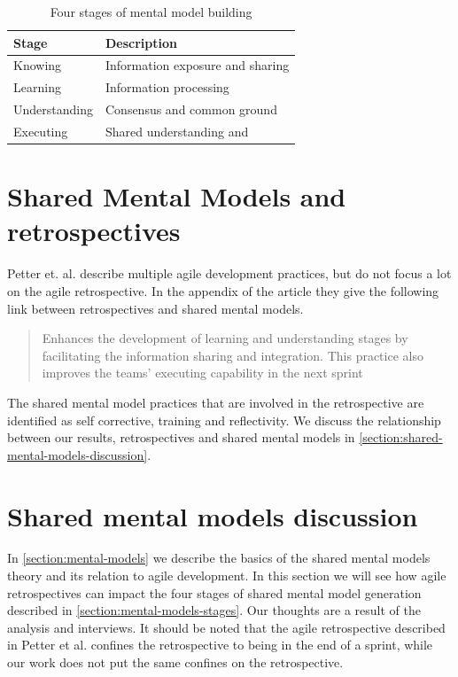 \begin{table}[!h]
	\begin{centering}
	\caption{Four stages of mental model building}
	\label{table:stages-mental-model}
	\begin{tabular}{l | p{}}

	\hline
	Stage & Description \\
	\hline
	Knowing &  Information exposure and sharing\\
	Learning & Information processing \\
	Understanding & Consensus and common ground \\
	Executing & Shared understanding and  \\
	\hline
	
\end{tabular}
\end{centering}
\end{table}

	
\section{Shared Mental Models and retrospectives}

Petter et. al. \cite{Petter2013} describe multiple agile development practices, but do not focus a lot on the agile retrospective. In the appendix of the article they give the following link between retrospectives and shared mental models.

\begin{quote}
Enhances the development of learning and understanding stages by facilitating the information sharing and integration. This practice also improves the teams’ executing capability in the next sprint
\end{quote}

The shared mental model practices that are involved in the retrospective are identified as self corrective, training and reflectivity. We discuss the relationship between our results, retrospectives and shared mental models in \autoref{section:shared-mental-models-discussion}.


\section{Shared mental models discussion}
\label{section:shared-mental-models-discussion}
In \autoref{section:mental-models} we describe the basics of the shared mental models theory and its relation to agile development. In this section we will see how agile retrospectives can impact the four stages of shared mental model generation described in \autoref{section:mental-models-stages}. Our thoughts are a result of the analysis and interviews. It should be noted that the agile retrospective described in Petter et al. \cite{Petter2013} confines the retrospective to being in the end of a sprint, while our work does not put the same confines on the retrospective.

